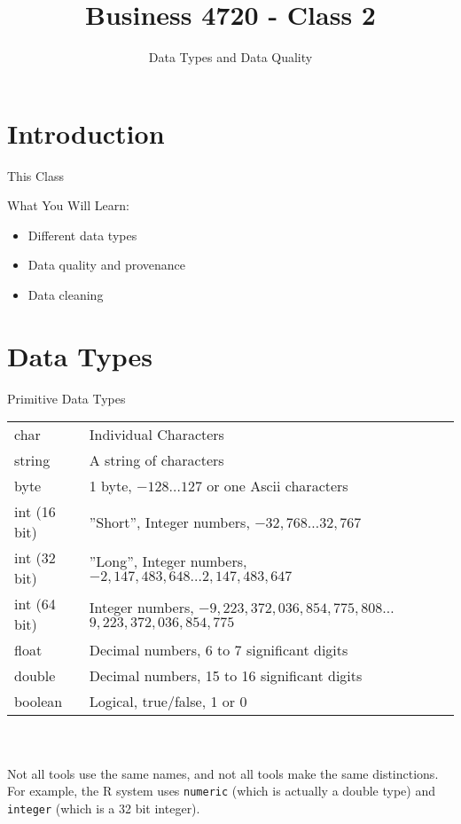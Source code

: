 \documentclass[ignorenonframetext,xcolor=x11names]{beamer}
\title{Business 4720 - Class 2}
\subtitle{Data Types and Data Quality}
\begin{document}
\begin{frame}{}
  \titlepage
  \footnotesize
  
\end{frame}

\section{Introduction}

\begin{frame}{This Class}

\begin{block}{What You Will Learn:}
\begin{itemize}
  \item Different data types
  \item Data quality and provenance
  \item Data cleaning
\end{itemize}
\end{block}
\end{frame}

\section{Data Types}

\begin{frame}{Primitive Data Types}
\small
\renewcommand{\arraystretch}{1.25}

\begin{tabularx}{\textwidth}{l|X} \hline
char 			& Individual Characters\\
string			& A string of characters\\
byte			& 1 byte, $-128 \ldots 127$ or one Ascii characters \\
int (16 bit)	& ''Short'', Integer numbers, $-32,768 \ldots 32,767$ \\ 
int (32 bit)	& ''Long'', Integer numbers, $-2,147,483,648 \ldots 2,147,483,647$ \\
int (64 bit)	& Integer numbers, $-9,223,372,036,854,775,808 \ldots$ $9,223,372,036,854,775$ \\
float			& Decimal numbers, 6 to 7 significant digits \\
double			& Decimal numbers, 15 to 16 significant digits \\
boolean			& Logical, true/false, 1 or 0 \\ \hline
\end{tabularx} \\
\vspace{5mm} \\
Not all tools use the same names, and not all tools make the same distinctions. For example, the R system uses \texttt{numeric} (which is actually a double type) and \texttt{integer} (which is a 32 bit integer).
\end{frame}
\end{document}
